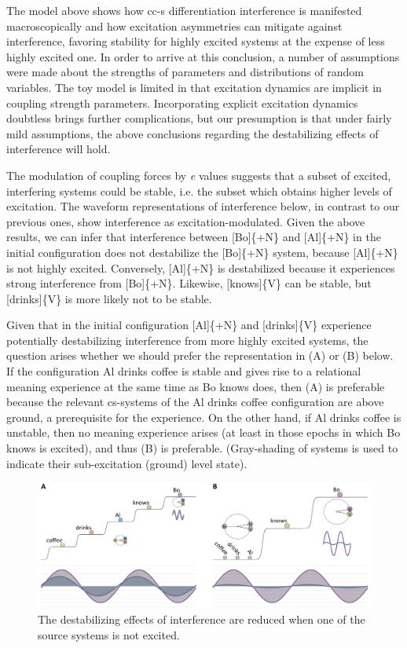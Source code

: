 The model above shows how cc-s differentiation interference is manifested macroscopically and how excitation asymmetries can mitigate against interference, favoring stability for highly excited systems at the expense of less highly excited one. In order to arrive at this conclusion, a number of assumptions were made about the strengths of parameters and distributions of random variables. The toy model is limited in that excitation dynamics are implicit in coupling strength parameters. Incorporating explicit excitation dynamics doubtless brings further complications, but our presumption is that under fairly mild assumptions, the above conclusions regarding the destabilizing effects of interference will hold.

  The modulation of coupling forces by \textit{e} values suggests that a subset of excited, interfering systems could be stable, i.e. the subset which obtains higher levels of excitation. The waveform representations of interference below, in contrast to our previous ones, show interference as excitation-modulated. Given the above results, we can infer that interference between [Bo]\{+N\} and [Al]\{+N\} in the initial configuration does not destabilize the [Bo]\{+N\} system, because [Al]\{+N\} is not highly excited. Conversely, [Al]\{+N\} is destabilized because it experiences strong interference from [Bo]\{+N\}. Likewise, [knows]\{V\} can be stable,  but [drinks]\{V\} is more likely not to be stable. 

  Given that in the initial configuration [Al]\{+N\} and [drinks]\{V\} experience potentially destabilizing interference from more highly excited systems, the question arises whether we should prefer the representation in (A) or (B) below. If the configuration {\textbar}Al drinks coffee{\textbar} is stable and gives rise to a relational meaning experience at the same time as {\textbar}Bo knows{\textbar} does, then (A) is preferable because the relevant cs-systems of the {\textbar}Al drinks coffee{\textbar} configuration are above ground, a prerequisite for the experience. On the other hand, if {\textbar}Al drinks coffee{\textbar} is unstable, then no meaning experience arises (at least in those epochs in which {\textbar}Bo knows{\textbar} is excited), and thus (B) is preferable. (Gray-shading of systems is used to indicate their sub-excitation (ground) level state).

  
\begin{figure}
\includegraphics[width=\textwidth]{figures/Tilsen-img95.png}
\caption{The destabilizing effects of interference are reduced when one of the source systems is not excited.}
\label{fig:4:45}
\end{figure}

